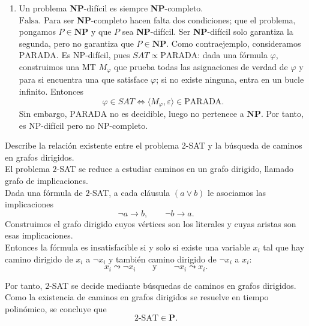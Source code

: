 \documentclass[12pt]{article}
\begin{document}
\begin{ejercicio}[2 puntos]
\begin{enumerate}
            Un contrajemplo sería el que sigue. Consideramos $P_1 = \emptyset$, que es decidible, y $P_2 = P_3 = \text{DIAGONAL}$,
            que no es semidecidible. Entonces $P_1 \propto P_2 \propto P_3$, pero $P_1$ sí es semidecidible, y $P_3$ no.
            
            \item Un problema \textbf{NP}-difícil es siempre \textbf{NP}-completo. \\
            
            $\boxed{\text{Falsa}}$. Para ser \textbf{NP}-completo hacen falta dos condiciones; que el problema, pongamos $P \in \textbf{NP}$
            y que $P$ sea \textbf{NP}-difícil. Ser \textbf{NP}-difícil solo garantiza la segunda, pero no garantiza que $P \in \textbf{NP}$.
            Como contraejemplo, consideramos $\text{PARADA}$. Es NP-difícil, pues
            $SAT \propto \text{PARADA}$: dada una fórmula $\varphi$, construimos una MT
            $M_\varphi$ que prueba todas las asignaciones de verdad de $\varphi$ y para
            si encuentra una que satisface $\varphi$; si no existe ninguna, entra en un
            bucle infinito. Entonces
            $$
            \varphi \in SAT \Longleftrightarrow \langle M_\varphi,\varepsilon\rangle
            \in \text{PARADA}.
            $$
            Sin embargo, $\text{PARADA}$ no es decidible, luego no pertenece a
            $\textbf{NP}$. Por tanto, es NP-difícil pero no NP-completo.
        \end{enumerate}
    \end{ejercicio}

    \begin{ejercicio}[1.5 puntos]
        Describe la relación existente entre el problema 2-SAT y la búsqueda de caminos en grafos dirigidos. \\

        El problema $2$-SAT se reduce a estudiar caminos en un grafo dirigido, llamado grafo de implicaciones. \\

        Dada una fórmula de $2$-SAT, a cada cláusula $(a\vee b)$ le asociamos las implicaciones
        $$
        \neg a \to b,
        \qquad
        \neg b \to a.
        $$
        Construimos el grafo dirigido cuyos vértices son los literales y cuyas aristas son esas implicaciones. \\

        Entonces la fórmula es insatisfacible si y solo si existe una variable $x_i$ tal que hay camino dirigido de $x_i$ a $\neg x_i$ y también camino dirigido de $\neg x_i$ a $x_i$:
        $$
        x_i \leadsto \neg x_i
        \qquad \text{y} \qquad
        \neg x_i \leadsto x_i.
        $$

        Por tanto, $2$-SAT se decide mediante búsquedas de caminos en grafos dirigidos. Como la existencia de caminos en grafos dirigidos se resuelve en tiempo polinómico, se concluye que
        $$
        2\text{-SAT}\in \mathbf{P}.
        $$
    \end{ejercicio}
\end{document}
